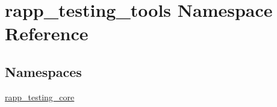 \hypertarget{namespacerapp__testing__tools}{\section{rapp\-\_\-testing\-\_\-tools Namespace Reference}
\label{namespacerapp__testing__tools}
}
\subsection*{Namespaces}
\begin{DoxyCompactItemize}
\item 
\hyperlink{namespacerapp__testing__tools_1_1rapp__testing__core}{rapp\-\_\-testing\-\_\-core}
\end{DoxyCompactItemize}

